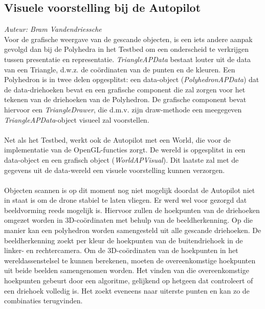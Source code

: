 \subsection{Visuele voorstelling bij de Autopilot}
{\em Auteur: Bram Vandendriessche}\\

\noindent
Voor de grafische weergave van de gescande objecten, is een iets andere aanpak gevolgd dan bij de Polyhedra in het Testbed om een onderscheid te verkrijgen tussen presentatie en representatie. \textit{TriangleAPData} bestaat louter uit de data van een Triangle, d.w.z. de co\"ordinaten van de punten en de kleuren. Een Polyhedron is in twee delen opgesplitst: een data-object (\textit{PolyhedronAPData}) dat de data-driehoeken bevat en een grafische component die zal zorgen voor het tekenen van de driehoeken van de Polyhedron. De grafische component bevat hiervoor een \textit{TriangleDrawer}, die d.m.v. zijn draw-methode een meegegeven \textit{TriangleAPData}-object visueel zal voorstellen.\\
\\
Net als het Testbed, werkt ook de Autopilot met een World, die voor de implementatie van de OpenGL-functies zorgt. De wereld is opgesplitst in een data-object en een grafisch object (\textit{WorldAPVisual}). Dit laatste zal met de gegevens uit de data-wereld een visuele voorstelling kunnen verzorgen.\\
\\
Objecten scannen is op dit moment nog niet mogelijk doordat de Autopilot niet in staat is om de drone stabiel te laten vliegen. Er werd wel voor gezorgd dat beeldvorming reeds mogelijk is. Hiervoor zullen de hoekpunten van de driehoeken omgezet worden in 3D-co\"ordinaten met behulp van de beeldherkenning. Op die manier kan een polyhedron worden samengesteld uit alle gescande driehoeken. De beeldherkenning zoekt per kleur de hoekpunten van de buitendriehoek in de linker- en rechtercamera. Om de 3D-co\"ordinaten van de hoekpunten in het wereldassenstelsel te kunnen berekenen, moeten de overeenkomstige hoekpunten uit beide beelden samengenomen worden. Het vinden van die overeenkomstige hoekpunten gebeurt door een algoritme, gelijkend op hetgeen dat controleert of een driehoek volledig is. Het zoekt eveneens naar uiterste punten en kan zo de combinaties terugvinden.  